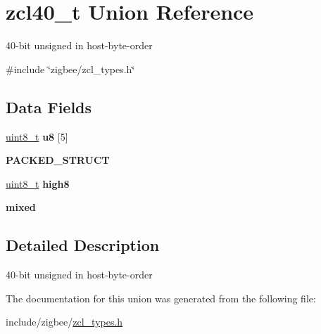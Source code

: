 \hypertarget{unionzcl40__t}{}\section{zcl40\+\_\+t Union Reference}
\label{unionzcl40__t}


40-\/bit unsigned in host-\/byte-\/order  




{\ttfamily \#include \char`\"{}zigbee/zcl\+\_\+types.\+h\char`\"{}}

\subsection*{Data Fields}
\begin{DoxyCompactItemize}
\item 
\hyperlink{group__hal__dos_gae1affc9ca37cfb624959c866a73f83c2}{uint8\+\_\+t} {\bfseries u8} \mbox{[}5\mbox{]}
\item 
{\bfseries P\+A\+C\+K\+E\+D\+\_\+\+S\+T\+R\+U\+CT}
\item 
\hyperlink{group__hal__dos_gae1affc9ca37cfb624959c866a73f83c2}{uint8\+\_\+t} {\bfseries high8}
\item 
{\bfseries mixed}
\end{DoxyCompactItemize}


\subsection{Detailed Description}
40-\/bit unsigned in host-\/byte-\/order 

The documentation for this union was generated from the following file\+:\begin{DoxyCompactItemize}
\item 
include/zigbee/\hyperlink{zcl__types_8h}{zcl\+\_\+types.\+h}\end{DoxyCompactItemize}
